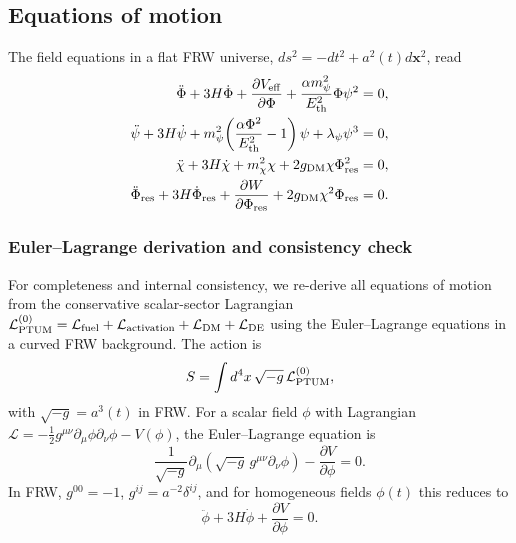 \documentclass[epj]{svjour}
\begin{document}
\subsection{Equations of motion}

The field equations in a flat FRW universe,
\(ds^2=-dt^2+a^2(t)d\mathbf{x}^2\), read
\begin{align}
\ddot\Phi+3H\dot\Phi
+\frac{\partial V_{\rm eff}}{\partial\Phi}
+\frac{\alpha m_\psi^2}{E_{\rm th}^2}\Phi\psi^2
&=0,
\label{eq:frw1}
\\
\ddot\psi+3H\dot\psi
+m_\psi^2\!\left(\frac{\alpha\Phi^2}{E_{\rm th}^2}-1\right)\psi
+\lambda_\psi\psi^3
&=0,
\label{eq:frw2}
\\
\ddot\chi+3H\dot\chi+m_\chi^2\chi
+2g_{\rm DM}\chi\Phi_{\rm res}^2
&=0,
\label{eq:frw3}
\\
\ddot\Phi_{\rm res}+3H\dot\Phi_{\rm res}
+\frac{\partial W}{\partial\Phi_{\rm res}}
+2g_{\rm DM}\chi^2\Phi_{\rm res}
&=0.
\label{eq:frw4}
\end{align}

\subsubsection{Euler--Lagrange derivation and consistency check}
\label{sec:eom_consistency}

For completeness and internal consistency, we re-derive all
equations of motion from the conservative scalar-sector Lagrangian
\(\mathcal{L}_{\rm PTUM}^{(0)} = \mathcal{L}_{\rm fuel} +
\mathcal{L}_{\rm activation} + \mathcal{L}_{\rm DM} +
\mathcal{L}_{\rm DE}\) using the Euler--Lagrange equations in a
curved FRW background. The action is
\begin{equation}
S = \int d^4x\,\sqrt{-g}\,\mathcal{L}_{\rm PTUM}^{(0)},
\end{equation}
with $\sqrt{-g} = a^3(t)$ in FRW.
For a scalar field \(\phi\) with Lagrangian
\(\mathcal{L} = -\tfrac{1}{2}g^{\mu\nu}\partial_\mu\phi\partial_\nu\phi
- V(\phi)\), the Euler--Lagrange equation is
\begin{equation}
\frac{1}{\sqrt{-g}}\partial_\mu\left(\sqrt{-g}\,g^{\mu\nu}
\partial_\nu\phi\right) - \frac{\partial V}{\partial\phi} = 0.
\end{equation}
In FRW, \(g^{00}=-1\), \(g^{ij}=a^{-2}\delta^{ij}\), and for
homogeneous fields \(\phi(t)\) this reduces to
\begin{equation}
\ddot\phi + 3H\dot\phi + \frac{\partial V}{\partial\phi} = 0.
\end{equation}
\end{document}

